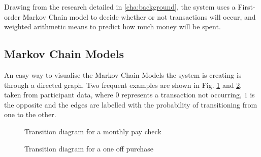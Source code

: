Drawing from the research detailed in \autoref{cha:background}, the system uses a First-order Markov Chain model to decide whether or not transactions will occur, and weighted arithmetic means to predict how much money will be spent.

\subsection{Markov Chain Models}

An easy way to visualise the Markov Chain Models the system is creating is through a directed graph. Two frequent examples are shown in Fig. \ref{fig:transition-monthly} and \ref{fig:transition-one}, taken from participant data, where $0$ represents a transaction not occurring, $1$ is the opposite and the edges are labelled with the probability of transitioning from one to the other.

\begin{figure}[h]
\centering
{}
\caption{Transition diagram for a monthly pay check}
\label{fig:transition-monthly}
\end{figure}

\begin{figure}[h]
\centering
{}
\caption{Transition diagram for a one off purchase}
\label{fig:transition-one}
\end{figure}

